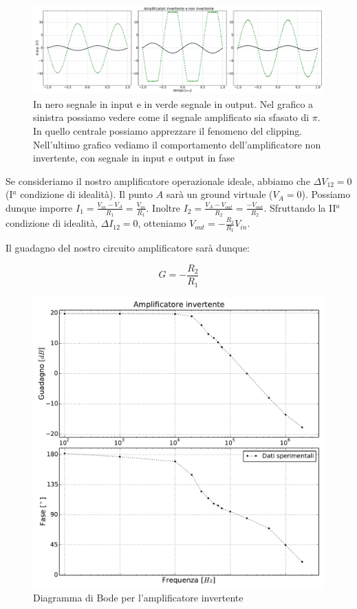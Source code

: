 \begin{figure}[h!]
	\centering
			\includegraphics[width=\textwidth]{serie_01_ampl.pdf}
			\caption{In nero segnale in input e in verde segnale in output. Nel grafico a sinistra possiamo vedere come il segnale amplificato sia sfasato di $\pi$. In quello centrale possiamo apprezzare il fenomeno del clipping. Nell'ultimo grafico vediamo il comportamento dell'amplificatore non invertente, con segnale in input e output in fase}
			\label{fig:der}
\end{figure}

Se consideriamo il nostro amplificatore operazionale ideale, abbiamo che $\Delta V_{12}=0$ (I$^a$ condizione di idealità).
Il punto $A$ sarà un ground virtuale ($V_A = 0$).
Possiamo dunque imporre $I_1=\frac{V_{in}-V_A}{R_1}=\frac{V_{in}}{R_1}$.
Inoltre $I_2=\frac{V_A-V_{out}}{R_2}=\frac{-V_{out}}{R_2}$.
Sfruttando la II$^a$ condizione di idealità, $\Delta I_{12}=0$, otteniamo $V_{out}=-\frac{R_2}{R_1} V_{in}$.

Il guadagno del nostro circuito amplificatore sarà dunque:

\begin{equation}
G=-\frac{R_2}{R_1}
\end{equation}

\begin{figure}
			\includegraphics[width=.48\textwidth]{b_inv.pdf}
			\caption{Diagramma di Bode per l'amplificatore invertente}
			\label{fig:invbode}
\end{figure}

